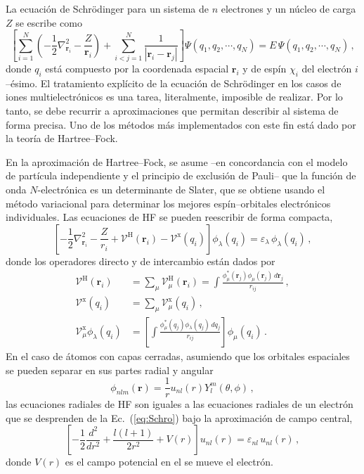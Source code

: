La ecuación de Schrödinger para un sistema de $n$ electrones y 
un núcleo de carga $Z$ se escribe como
\begin{equation}
\left[
\sum_{i=1}^N \left(-\frac{1}{2}\nabla^2_{{\mathbf r}_i}
                   -\frac{Z}{{\mathbf r}_i}\right) + 
\sum_{i<j=1}^N \frac{1}{|{\mathbf r}_i - {\mathbf r}_j |} 
\right] \Psi\left(q_1,q_2,\cdots,q_N\right) 
= E\, \Psi\left(q_1,q_2,\cdots,q_N\right) 
\, ,
\label{eq:Schro}
\end{equation}
donde $q_i$ está compuesto por la coordenada espacial $\mathbf{r}_i$ y 
de espín $\chi_i$ del electrón $i$--ésimo. El tratamiento explícito de 
la ecuación de Schr\"odinger en los casos de iones multielectrónicos es 
una tarea, literalmente, imposible de realizar. Por lo tanto, se debe 
recurrir a aproximaciones que permitan describir al sistema de forma 
precisa. Uno de los métodos más implementados con este fin está dado por 
la teoría de Hartree--Fock. 

En la aproximación de Hartree--Fock, se asume --en concordancia con el 
modelo de partícula independiente y el principio de exclusión de Pauli-- 
que la función de onda $N$-electrónica es un determinante de Slater, que 
se obtiene usando el método variacional para determinar los mejores 
espín--orbitales electrónicos individuales. Las ecuaciones de HF se 
pueden reescribir de forma compacta, 
\begin{equation}
\left[-\frac{1}{2}\nabla_{\mathbf{r}_i}^2-\frac{Z}{r_i}
+\mathcal{V}^{\mathrm{H}}(\mathbf{r}_i)
-\mathcal{V}^{\mathrm{x}}(q_i) \right]
\phi_{\lambda}(q_i)=\varepsilon_{\lambda}\,\phi_{\lambda}(q_i)\,,
\label{eq:compactHFeqs}
\end{equation}
donde los operadores directo y de intercambio están dados por
\begin{align}
\mathcal{V}^{\mathrm{H}}(\mathbf{r}_i) &
=\sum_\mu \mathcal{V}_\mu^{\mathrm{H}}(\mathbf{r}_i)
=\int\frac{\phi_{\mu}^*(\mathbf{r}_j)\phi_{\mu}(\mathbf{r}_j)\, 
d\mathbf{r}_j}{r_{ij}} \,, \\
\mathcal{V}^{\mathrm{x}}(q_i) 
&=\sum_\mu \mathcal{V}_\mu^{\mathrm{x}}(q_i) \,,\\
\mathcal{V}_\mu^{\mathrm{x}} \phi_{\lambda}(q_i) &= \left[
\int\frac{\phi_{\mu}^*(q_j)\phi_{\lambda}(q_j)\,dq_j}{r_{ij}} \right] 
\phi_\mu(q_i)\,.
\end{align}
En el caso de átomos con capas cerradas, asumiendo que los orbitales 
espaciales se pueden separar en sus partes radial y angular
\begin{equation}
\phi_{nlm}(\mathbf{r})=\frac{1}{r}u_{nl}(r)Y_l^m(\theta,\phi)\,,
\label{eq:centralfield-wave}
\end{equation}
las ecuaciones radiales de HF son iguales a las ecuaciones radiales de 
un electrón que se desprenden de la Ec.~(\ref{eq:Schro}) bajo la 
aproximación de campo central, 
\begin{equation}
 \left[ -\frac{1}{2}\frac{d^2}{dr^2} + \frac{l(l+1)}{2r^2} +
 V(r) \right] u_{nl}(r) = \varepsilon_{nl} \, u_{nl}(r)\,,
\label{eq:eqSchroRadial}
\end{equation}
donde $V(r)$ es el campo potencial en el se mueve el electrón.

